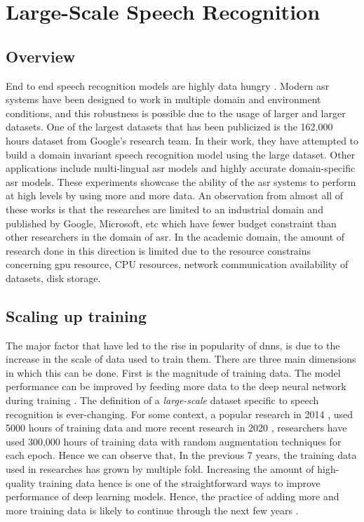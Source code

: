 \chapter{Large-Scale Speech Recognition}
\label{chapter:largescale}

\section{Overview}
End to end speech recognition models are highly data hungry \cite{Li2020OnRecognition}. Modern \acrshort{asr} systems have been designed to work in multiple domain and environment conditions, and this robustness is possible due to the usage of larger and larger datasets. One of the largest datasets that has been publicized is the 162,000 hours dataset from Google's research team. In their work, they have attempted to build a domain invariant speech recognition model using the large dataset\cite{Narayanan2019TowardTraining}. Other applications include multi-lingual \acrshort{asr} models \cite{Kannan2019Large-ScaleModel} and highly accurate domain-specific \acrshort{asr} models. These experiments showcase the ability of the \acrshort{asr} systems to perform at high levels by using more and more data. An observation from almost all of these works is that the researches are limited to an industrial domain and published by Google, Microsoft, etc which have fewer budget constraint than other researchers in the domain of \acrshort{asr}. In the academic domain, the amount of research done in this direction is limited due to the resource constrains concerning \acrshort{gpu} resource, CPU resources, network communication availability of datasets, disk storage. 

\section{Scaling up training}
The major factor that have led to the rise in popularity of \acrshort{dnn}s, is due to the increase in the scale of data used to train them. There are three main dimensions in which this can be done. First is the magnitude of training data. The model performance can be improved by feeding more data to the deep neural network during training \cite{Hestness2017DEEPEMPIRICALLY}. The definition of a \emph{large-scale} dataset specific to speech recognition is ever-changing. For some context, a popular research in 2014 \cite{Hannun2014DeepRecognition}, used 5000 hours of training data and more recent research in 2020 \cite{Narayanan2019RECOGNIZINGMODELS}, researchers have used 300,000 hours of training data with random augmentation techniques for each epoch. Hence we can observe that, In the previous 7 years, the training data used in researches has grown by multiple fold. Increasing the amount of high-quality training data hence is one of the straightforward ways to improve performance of deep learning models. Hence, the practice of adding more and more training data is likely to continue through the next few years \cite{Mayer2020ScalableInfrastructures}. 


